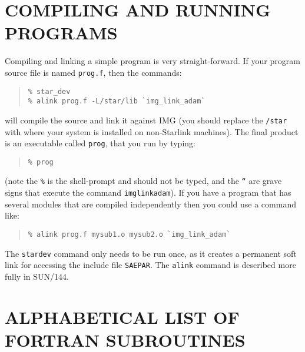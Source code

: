\documentclass[twoside,11pt]{article}
\newcommand{\xref}[3]{#1}
\newcommand{\xlabel}[1]{}
\renewcommand{\_}{\texttt{\symbol{95}}}
\newcommand{\myverb}[1]{{\texttt{#1}}}
\newenvironment{code}{\begin{small} \begin{quote}}
                     {\end{quote} \end{small}}
\newcommand{\latexonlysection}[1]{\section{#1}}
\newcommand{\latexonlysection}[1]{#1}
\begin{document}
\section{COMPILING \label{IMGCOMPILING}AND RUNNING PROGRAMS}
Compiling and linking a simple program is very straight-forward. If
your program source file is named \myverb{prog.f}, then the commands:
\begin{code}
\begin{verbatim}
% star_dev
% alink prog.f -L/star/lib `img_link_adam`
\end{verbatim}
\end{code}
will compile the source and link it against IMG (you should replace
the \myverb{/star} with where your system is installed on non-Starlink
machines). The final product is an executable called \myverb{prog},
that you run by typing:
\begin{code}
\begin{verbatim}
% prog
\end{verbatim}
\end{code}
(note the \myverb{\%} is the shell-prompt and should not be typed, and
the \myverb{``} are grave signs that execute the command
\myverb{img\_link\_adam}).  If you have a program that has several
modules that are compiled independently then you could use a
command like:
\begin{code}
\begin{verbatim}
% alink prog.f mysub1.o mysub2.o `img_link_adam`
\end{verbatim}
\end{code}
The \myverb{star\_dev} command only needs to be run once, as it creates
a permanent soft link for accessing the include file \myverb{SAE\_PAR}.
The \xref{\myverb{alink}}{sun144}{ADAM_link_scripts}
command is described more fully in \xref{SUN/144}{sun144}{}.

\appendix
\xlabel{appendix}

  \newpage
  \latexonlysection{ALPHABETICAL LIST OF FORTRAN SUBROUTINES}


\end{document}
